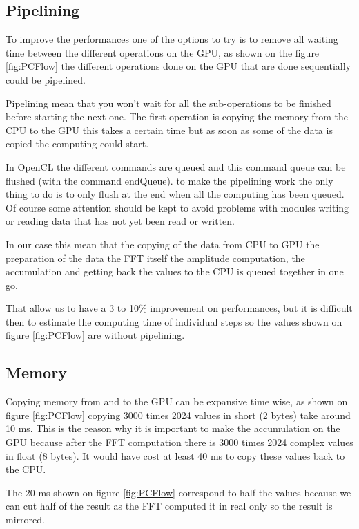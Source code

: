    \subsection{Pipelining}

   To improve the performances one of the options to try is to remove all waiting time between the different operations on the \gls{GPU}, as shown on the figure \ref{fig:PCFlow} the different operations done on the \gls{GPU} that are done sequentially could be pipelined.

   Pipelining mean that you won't wait for all the sub-operations to be finished before starting the next one. The first operation is copying the memory from the \gls{CPU} to the \gls{GPU} this takes a certain time but as soon as some of the data is copied the computing could start.

   In \gls{OpenCL} the different commands are queued and this command queue can be flushed (with the command endQueue). to make the pipelining work the only thing to do is to only flush at the end when all the computing has been queued. Of course some attention should be kept to avoid problems with modules writing or reading data that has not yet been read or written.

   In our case this mean that the copying of the data from \gls{CPU} to \gls{GPU} the preparation of the data the \gls{FFT} itself the amplitude computation, the accumulation and getting back the values to the \gls{CPU} is queued together in one go.

   That allow us to have a 3 to 10\% improvement on performances, but it is difficult then to estimate the computing time of individual steps so the values shown on figure \ref{fig:PCFlow} are without pipelining.

   \subsection{Memory}

   Copying memory from and to the \gls{GPU} can be expansive time wise, as shown on figure \ref{fig:PCFlow} copying 3000 times 2024 values in short (2 bytes) take around 10 ms. This is the reason why it is important to make the accumulation on the \gls{GPU} because after the \gls{FFT} computation there is 3000 times 2024 complex values in float (8 bytes). It would have cost at least 40 ms to copy these values back to the \gls{CPU}. 

   The 20 ms shown on figure \ref{fig:PCFlow} correspond to half the values because we can cut half of the result as the \gls{FFT} computed it in real only so the result is mirrored.
	
